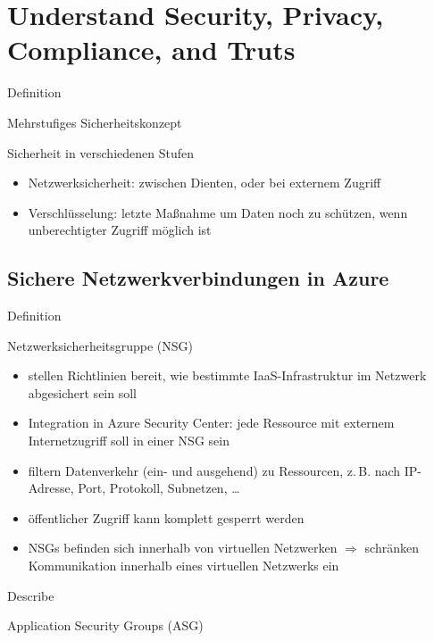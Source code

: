 \documentclass{scrartcl}
\newenvironment{flashcard}[2][]{%
    #1
    \vfill
    \centerline{\Large{#2}}
    \vfill
\newpage
}
{\newpage}
\newcommand{\sectioncard}[1]{
    \vspace*{\stretch{1}}
    \section{#1}
    \vspace*{\stretch{1}}
    \pagebreak
}
\newcommand{\subsectioncard}[1]{
    \vspace*{\stretch{1}}
    \subsection{#1}
    \vspace*{\stretch{1}}
    \pagebreak
}
\begin{document}
    \sectioncard{Understand Security, Privacy, Compliance, and Truts}

    \begin{flashcard}[Definition]{Mehrstufiges Sicherheitskonzept}
        Sicherheit in verschiedenen Stufen
        \begin{itemize}
            \item Netzwerksicherheit: zwischen Dienten, oder bei externem Zugriff
            \item Verschlüsselung: letzte Maßnahme um Daten noch zu schützen, wenn unberechtigter Zugriff möglich ist
        \end{itemize}
    \end{flashcard}

    \subsectioncard{Sichere Netzwerkverbindungen in Azure}

    \begin{flashcard}[Definition]{Netzwerksicherheitsgruppe (NSG)}
        \begin{itemize}
            \item stellen Richtlinien bereit, wie bestimmte IaaS-Infrastruktur im Netzwerk abgesichert sein soll
            \item Integration in Azure Security Center: jede Ressource mit externem Internetzugriff soll in einer NSG sein
            \item filtern Datenverkehr (ein- und ausgehend) zu Ressourcen, z.\,B. nach IP-Adresse, Port, Protokoll, Subnetzen, \ldots
            \item öffentlicher Zugriff kann komplett gesperrt werden
            \item NSGs befinden sich innerhalb von virtuellen Netzwerken\newline
            $\Rightarrow$ schränken Kommunikation innerhalb eines virtuellen Netzwerks ein
        \end{itemize}

    \end{flashcard}

    \begin{flashcard}[Describe]{Application Security Groups (ASG)}

    \end{flashcard}
\end{document}
